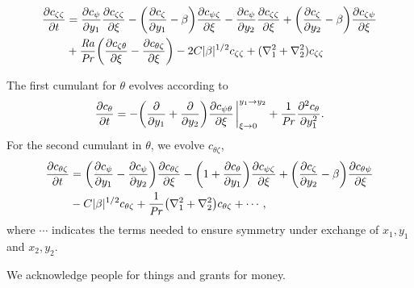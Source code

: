 \documentclass{jfm}
\newcommand{\cz}{c_{\zeta}}
\newcommand{\cs}{c_{\psi}}
\newcommand{\ct}{c_{\theta}}
\newcommand{\csz}{c_{\psi \zeta}}
\newcommand{\czs}{c_{\zeta \psi}}
\newcommand{\czz}{c_{\zeta \zeta}}
\newcommand{\ctz}{c_{\theta \zeta}}
\newcommand{\czt}{c_{\zeta \theta}}
\newcommand{\cst}{c_{\psi \theta}}
\newcommand{\cts}{c_{\theta \psi}}
\newcommand{\Ray}{\mbox{\textit{Ra}}}  %
\begin{document}
\begin{equation}
  \label{eq:czz}
  \begin{split}
    \pdv{\czz}{t} &= \pdv{\cs}{y_1} \pdv{\czz}{\xi} - \qty(\pdv{\cz}{y_1} - \beta) \pdv{\csz}{\xi} - \pdv{\cs}{y_2} \pdv{\czz}{\xi}  + \qty(\pdv{\cz}{y_2} - \beta) \pdv{\czs}{\xi}\\
    &+ \frac{\Ray}{\Pran} \qty(\pdv{\czt}{\xi} -  \pdv{\ctz}{\xi}) - 2C |\beta|^{1/2} \czz + (\nabla_1^2 + \nabla_2^2) \czz    
  \end{split}
\end{equation}

The first cumulant for $\theta$ evolves according to
\begin{equation}
  \label{eq:ct}
  \pdv{\ct}{t} = - \qty(\pdv{y_1} + \pdv{y_2}) \pdv{\cst}{\xi} \eval_{\xi \to 0}^{y_1 \to y_2} + \frac{1}{\Pran} \pdv[2]{\ct}{y_1}.
\end{equation}
For the second cumulant in $\theta$, we evolve $\ctz$,
\begin{equation}
  \label{eq:ctz}
  \begin{split}
    \pdv{\ctz}{t} &= \qty(\pdv{\cs}{y_1} - \pdv{\cs}{y_2}) \pdv{\ctz}{\xi} - \qty(1 + \pdv{\ct}{y_1}) \pdv{\csz}{\xi} + \qty(\pdv{\cz}{y_2} - \beta) \pdv{\cts}{\xi}\\
    &  - C |\beta|^{1/2} \ctz + \frac{1}{\Pran}\qty(\nabla_1^2 + \nabla_2^2) \ctz + \cdots,    
  \end{split}
\end{equation}
where $\cdots$ indicates the terms needed to ensure symmetry under exchange of $x_1, y_1$ and $x_2, y_2$.

We acknowledge people for things and grants for money. 



\end{document}

